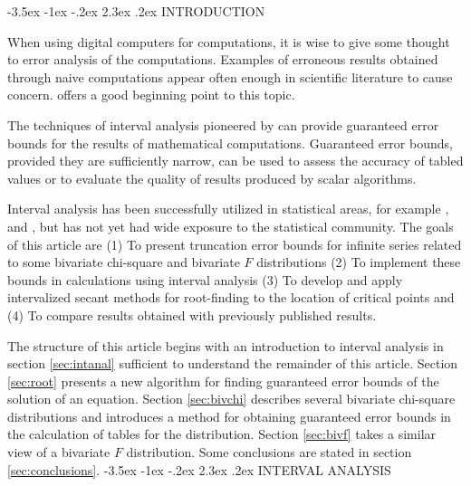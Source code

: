 \documentclass[10pt,letterpaper]{article}
\makeatletter
\renewcommand\section{\@startsection {section}{1}{\z@}%
                 {-3.5ex \@plus -1ex \@minus -.2ex}%
                 {2.3ex \@plus.2ex}%
                 {\normalfont\normalsize\bfseries }}
\makeatother
\begin{document}

\section{INTRODUCTION\label{sec:intro}}

When using digital computers for computations, it is wise to give some thought
to error analysis of the computations.
Examples of  erroneous results obtained through naive computations
appear often enough in scientific literature to cause concern.
\cite{McCullough98, McCullough99} offers a good beginning point to this topic.

The techniques of interval analysis pioneered by \cite{Moore66,
Moore79} can provide guaranteed error bounds for the
results of mathematical computations.
Guaranteed error bounds, provided they are sufficiently narrow, can be used
to assess the accuracy of tabled values or to evaluate the quality of
results produced by scalar algorithms.

Interval analysis has been successfully utilized in statistical areas, 
for example \cite{WangKennedyJASA}, and \cite{WrightEM}, 
but has not yet had wide exposure to the
statistical community.
The goals of this article are 
(1) To present truncation error bounds for infinite series related to some
bivariate chi-square and bivariate $F$ distributions
(2) To implement these bounds in calculations using interval analysis
(3) To develop and apply intervalized secant methods for root-finding
to the location of critical points and
(4) To compare results obtained with previously published results.

The structure of this article begins with an introduction to interval analysis 
in section \ref{sec:intanal} 
sufficient to understand the remainder of this article.  Section
\ref{sec:root} presents a new algorithm for finding guaranteed error bounds of
the solution of an equation.
Section \ref{sec:bivchi} describes several bivariate chi-square distributions
and introduces a method for obtaining guaranteed error bounds in the
calculation of tables for the distribution.
Section \ref{sec:bivf} takes a similar view of a bivariate $F$ distribution.
Some conclusions are stated in section \ref{sec:conclusions}.
\section{INTERVAL ANALYSIS\label{sec:intanal}}
\end{document}

